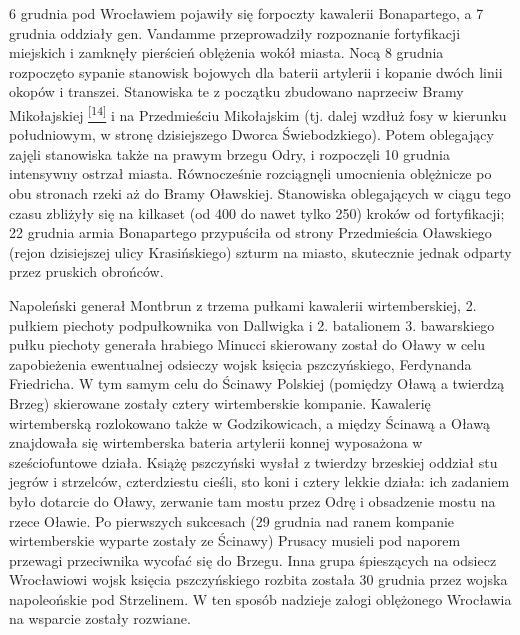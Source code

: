 \documentclass{article}
\begin{document}
6 grudnia pod Wrocławiem pojawiły się forpoczty kawalerii Bonapartego, a 7 grudnia oddziały gen. Vandamme przeprowadziły rozpoznanie fortyfikacji miejskich i zamknęły pierścień oblężenia wokół miasta. Nocą 8 grudnia rozpoczęto sypanie stanowisk bojowych dla baterii artylerii i kopanie dwóch linii okopów i transzei. Stanowiska te z początku zbudowano naprzeciw Bramy Mikołajskiej \hyperlink{14}{\textsuperscript{[14]}} i na Przedmieściu Mikołajskim (tj. dalej wzdłuż fosy w kierunku południowym, w stronę dzisiejszego Dworca Świebodzkiego). Potem oblegający zajęli stanowiska także na prawym brzegu Odry, i rozpoczęli 10 grudnia intensywny ostrzał miasta. Równocześnie rozciągnęli umocnienia oblężnicze po obu stronach rzeki aż do Bramy Oławskiej. Stanowiska oblegających w ciągu tego czasu zbliżyły się na kilkaset (od 400 do nawet tylko 250) kroków od fortyfikacji; 22 grudnia armia Bonapartego przypuściła od strony Przedmieścia Oławskiego (rejon dzisiejszej ulicy Krasińskiego) szturm na miasto, skutecznie jednak odparty przez pruskich obrońców.

Napoleński generał Montbrun z trzema pułkami kawalerii wirtemberskiej, 2. pułkiem piechoty podpułkownika von Dallwigka i 2. batalionem 3. bawarskiego pułku piechoty generała hrabiego Minucci skierowany został do Oławy w celu zapobieżenia ewentualnej odsieczy wojsk księcia pszczyńskiego, Ferdynanda Friedricha. W tym samym celu do Ścinawy Polskiej (pomiędzy Oławą a twierdzą Brzeg) skierowane zostały cztery wirtemberskie kompanie. Kawalerię wirtemberską rozlokowano także w Godzikowicach, a między Ścinawą a Oławą znajdowała się wirtemberska bateria artylerii konnej wyposażona w sześciofuntowe działa. Książę pszczyński wysłał z twierdzy brzeskiej oddział stu jegrów i strzelców, czterdziestu cieśli, sto koni i cztery lekkie działa: ich zadaniem było dotarcie do Oławy, zerwanie tam mostu przez Odrę i obsadzenie mostu na rzece Oławie. Po pierwszych sukcesach (29 grudnia nad ranem kompanie wirtemberskie wyparte zostały ze Ścinawy) Prusacy musieli pod naporem przewagi przeciwnika wycofać się do Brzegu. Inna grupa śpieszących na odsiecz Wrocławiowi wojsk księcia pszczyńskiego rozbita została 30 grudnia przez wojska napoleońskie pod Strzelinem. W ten sposób nadzieje załogi oblężonego Wrocławia na wsparcie zostały rozwiane.
\end{document}
